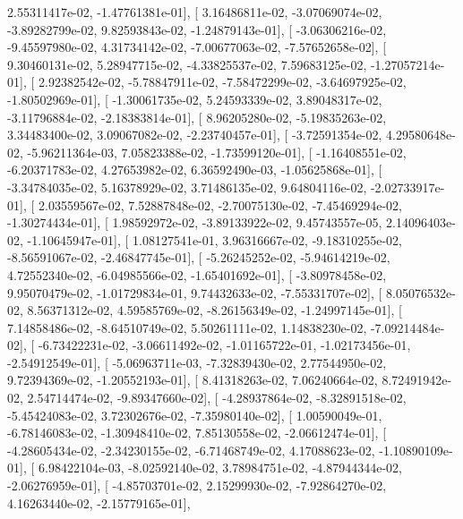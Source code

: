 \documentclass{article}
\begin{document}
          2.55311417e-02,  -1.47761381e-01],
       [  3.16486811e-02,  -3.07069074e-02,  -3.89282799e-02,
          9.82593843e-02,  -1.24879143e-01],
       [ -3.06306216e-02,  -9.45597980e-02,   4.31734142e-02,
         -7.00677063e-02,  -7.57652658e-02],
       [  9.30460131e-02,   5.28947715e-02,  -4.33825537e-02,
          7.59683125e-02,  -1.27057214e-01],
       [  2.92382542e-02,  -5.78847911e-02,  -7.58472299e-02,
         -3.64697925e-02,  -1.80502969e-01],
       [ -1.30061735e-02,   5.24593339e-02,   3.89048317e-02,
         -3.11796884e-02,  -2.18383814e-01],
       [  8.96205280e-02,  -5.19835263e-02,   3.34483400e-02,
          3.09067082e-02,  -2.23740457e-01],
       [ -3.72591354e-02,   4.29580648e-02,  -5.96211364e-03,
          7.05823388e-02,  -1.73599120e-01],
       [ -1.16408551e-02,  -6.20371783e-02,   4.27653982e-02,
          6.36592490e-03,  -1.05625868e-01],
       [ -3.34784035e-02,   5.16378929e-02,   3.71486135e-02,
          9.64804116e-02,  -2.02733917e-01],
       [  2.03559567e-02,   7.52887848e-02,  -2.70075130e-02,
         -7.45469294e-02,  -1.30274434e-01],
       [  1.98592972e-02,  -3.89133922e-02,   9.45743557e-05,
          2.14096403e-02,  -1.10645947e-01],
       [  1.08127541e-01,   3.96316667e-02,  -9.18310255e-02,
         -8.56591067e-02,  -2.46847745e-01],
       [ -5.26245252e-02,  -5.94614219e-02,   4.72552340e-02,
         -6.04985566e-02,  -1.65401692e-01],
       [ -3.80978458e-02,   9.95070479e-02,  -1.01729834e-01,
          9.74432633e-02,  -7.55331707e-02],
       [  8.05076532e-02,   8.56371312e-02,   4.59585769e-02,
         -8.26156349e-02,  -1.24997145e-01],
       [  7.14858486e-02,  -8.64510749e-02,   5.50261111e-02,
          1.14838230e-02,  -7.09214484e-02],
       [ -6.73422231e-02,  -3.06611492e-02,  -1.01165722e-01,
         -1.02173456e-01,  -2.54912549e-01],
       [ -5.06963711e-03,  -7.32839430e-02,   2.77544950e-02,
          9.72394369e-02,  -1.20552193e-01],
       [  8.41318263e-02,   7.06240664e-02,   8.72491942e-02,
          2.54714474e-02,  -9.89347660e-02],
       [ -4.28937864e-02,  -8.32891518e-02,  -5.45424083e-02,
          3.72302676e-02,  -7.35980140e-02],
       [  1.00590049e-01,  -6.78146083e-02,  -1.30948410e-02,
          7.85130558e-02,  -2.06612474e-01],
       [ -4.28605434e-02,  -2.34230155e-02,  -6.71468749e-02,
          4.17088623e-02,  -1.10890109e-01],
       [  6.98422104e-03,  -8.02592140e-02,   3.78984751e-02,
         -4.87944344e-02,  -2.06276959e-01],
       [ -4.85703701e-02,   2.15299930e-02,  -7.92864270e-02,
          4.16263440e-02,  -2.15779165e-01],
\end{document}
